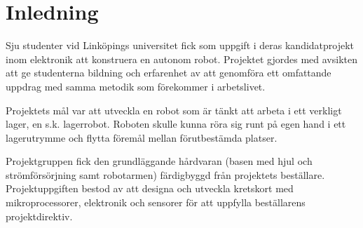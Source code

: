 

\section{Inledning}
Sju studenter vid Linköpings universitet fick som uppgift i deras kandidatprojekt inom elektronik att konstruera en autonom robot. Projektet gjordes med avsikten att ge studenterna bildning och erfarenhet av att genomföra ett omfattande uppdrag med samma metodik som förekommer i arbetslivet.

Projektets mål var att utveckla en robot som är tänkt att arbeta i ett verkligt lager, en s.k. lagerrobot. Roboten skulle kunna röra sig runt på egen hand i ett lagerutrymme och flytta föremål mellan förutbestämda platser.

Projektgruppen fick den grundläggande hårdvaran (basen med hjul och strömförsörjning samt robotarmen) färdigbyggd från projektets beställare. Projektuppgiften bestod av att designa och utveckla kretskort med mikroprocessorer, elektronik och sensorer för att uppfylla beställarens projektdirektiv.